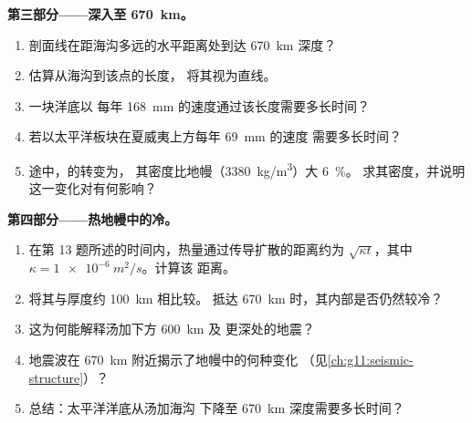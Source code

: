 \begin{problem}
\medskip
\noindent\textbf{第三部分——深入至 \qty{670}{km}。}
\begin{enumerate}[resume]
  \item 剖面线在距海沟多远的水平距离处到达
        \qty{670}{km} 深度？
  \item 估算从海沟到该点的长度，
        将其视为直线。
  \item 一块洋底以
        每年 \qty{168}{mm} 的速度通过该长度需要多长时间？
  \item 若以太平洋板块在夏威夷上方每年 \qty{69}{mm} 的速度
        需要多长时间？
  \item 途中，的转变为，
        其密度比地幔（\qty{3380}{kg/m^3}）大 \qty{6}{\percent}。
        求其密度，并说明这一变化对有何影响？
\end{enumerate}

\medskip
\noindent\textbf{第四部分——热地幔中的冷。}
\begin{enumerate}[resume]
  \item 在第 13 题所述的时间内，热量通过传导扩散的距离约为
        $\sqrt{\kappa t}$，其中 $\kappa = \qty{1e-6}{m^2/s}$。计算该
        距离。
  \item 将其与厚度约 \qty{100}{km} 相比较。
        抵达 \qty{670}{km} 时，其内部是否仍然较冷？
  \item 这为何能解释汤加下方 \qty{600}{km} 及
        更深处的地震？
  \item 地震波在 \qty{670}{km} 附近揭示了地幔中的何种变化
        （见\cref{ch:g11:seismic-structure}）？
  \item 总结：太平洋洋底从汤加海沟
        下降至 \qty{670}{km} 深度需要多长时间？
\end{enumerate}
\end{problem}
